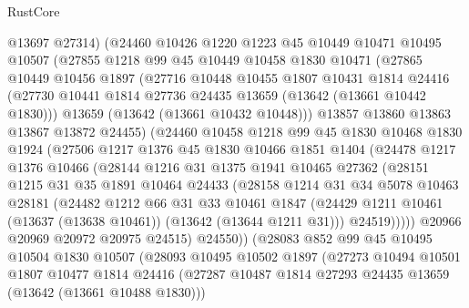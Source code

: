 \begin{lexlean}{RustCore}
\begin{coremodule}
        @13697
        @27314)
      (@24460
        @10426
        @1220
        @1223
        @45
        @10449
        @10471
        @10495
        @10507
        (@27855
          @1218
          @99
          @45
          @10449
          @10458
          @1830
          @10471
          (@27865
            @10449
            @10456
            @1897
            (@27716
              @10448
              @10455
              @1807
              @10431
              @1814
              @24416
              (@27730 @10441 @1814 @27736 @24435 @13659 (@13642 (@13661 @10442 @1830)))
              @13659
              (@13642 (@13661 @10432 @10448)))
            @13857
            @13860
            @13863
            @13867
            @13872
            @24455)
          (@24460
            @10458
            @1218
            @99
            @45
            @1830
            @10468
            @1830
            @1924
            (@27506
              @1217
              @1376
              @45
              @1830
              @10466
              @1851
              @1404
              (@24478
                @1217
                @1376
                @10466
                (@28144
                  @1216
                  @31
                  @1375
                  @1941
                  @10465
                  @27362
                  (@28151
                    @1215
                    @31
                    @35
                    @1891
                    @10464
                    @24433
                    (@28158
                      @1214
                      @31
                      @34
                      @5078
                      @10463
                      @28181
                      (@24482
                        @1212
                        @66
                        @31
                        @33
                        @10461
                        @1847
                        (@24429 @1211 @10461 (@13637 (@13638 @10461)) (@13642 (@13644 @1211 @31)))
                        @24519)))))
              @20966
              @20969
              @20972
              @20975
              @24515)
            @24550))
        (@28083
          @852
          @99
          @45
          @10495
          @10504
          @1830
          @10507
          (@28093
            @10495
            @10502
            @1897
            (@27273
              @10494
              @10501
              @1807
              @10477
              @1814
              @24416
              (@27287 @10487 @1814 @27293 @24435 @13659 (@13642 (@13661 @10488 @1830)))

\end{coremodule}
\end{lexlean}

